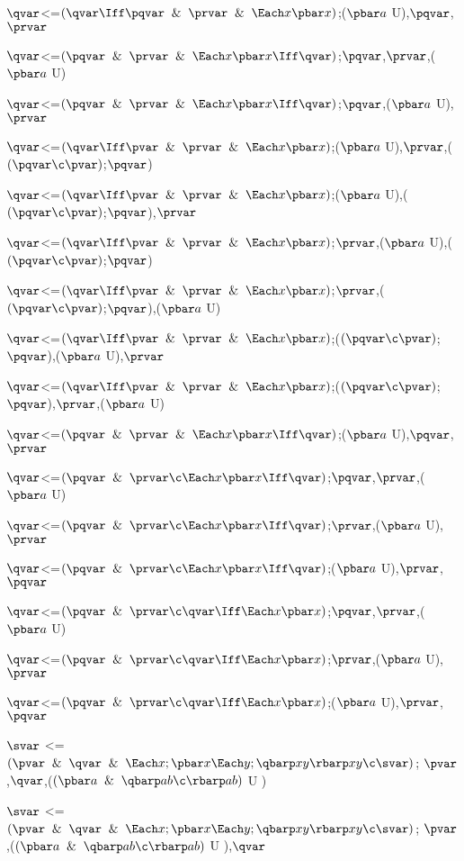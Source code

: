$\qvar$<=$(\qvar \Iff\pqvar \And \prvar\And \Each x\pbar x)$;($\pbar a$ U),$\pqvar$,$\prvar$

$\qvar$<=$(\pqvar \And \prvar \And \Each x\pbar x\Iff\qvar)$;$\pqvar$,$\prvar$,($\pbar a$ U)

$\qvar$<=$(\pqvar \And \prvar \And \Each x\pbar x\Iff\qvar)$;$\pqvar$,($\pbar a$ U),$\prvar$

$\qvar$<=$(\qvar \Iff\pvar \And \prvar\And \Each x\pbar x)$;($\pbar a$ U),$\prvar$,($(\pqvar \c \pvar)$;$\pqvar$)

$\qvar$<=$(\qvar \Iff\pvar \And \prvar\And \Each x\pbar x)$;($\pbar a$ U),($(\pqvar \c \pvar)$;$\pqvar$),$\prvar$

$\qvar$<=$(\qvar \Iff\pvar \And \prvar\And \Each x\pbar x)$;$\prvar$,($\pbar a$ U),($(\pqvar \c \pvar)$;$\pqvar$)

$\qvar$<=$(\qvar \Iff\pvar \And \prvar\And \Each x\pbar x)$;$\prvar$,($(\pqvar \c \pvar)$;$\pqvar$),($\pbar a$ U)

$\qvar$<=$(\qvar \Iff\pvar \And \prvar\And \Each x\pbar x)$;($(\pqvar \c \pvar)$;$\pqvar$),($\pbar a$ U),$\prvar$

$\qvar$<=$(\qvar \Iff\pvar \And \prvar\And \Each x\pbar x)$;($(\pqvar \c \pvar)$;$\pqvar$),$\prvar$,($\pbar a$ U)

$\qvar$<=$(\pqvar \And \prvar \And \Each x\pbar x\Iff\qvar)$;($\pbar a$ U),$\pqvar$,$\prvar$

$\qvar$<=$(\pqvar \And \prvar \c \Each x \pbar x\Iff \qvar)$;$\pqvar$,$\prvar$,($\pbar a$ U)

$\qvar$<=$(\pqvar \And \prvar \c \Each x \pbar x\Iff \qvar)$;$\prvar$,($\pbar a$ U),$\prvar$

$\qvar$<=$(\pqvar \And \prvar \c \Each x \pbar x\Iff \qvar)$;($\pbar a$ U),$\prvar$,$\pqvar$

$\qvar$<=$(\pqvar \And \prvar \c \qvar \Iff\Each x \pbar x)$;$\pqvar$,$\prvar$,($\pbar a$ U)

$\qvar$<=$(\pqvar \And \prvar \c \qvar \Iff\Each x \pbar x)$;$\prvar$,($\pbar a$ U),$\prvar$

$\qvar$<=$(\pqvar \And \prvar \c \qvar \Iff\Each x \pbar x)$;($\pbar a$ U),$\prvar$,$\pqvar$

$\svar$ <=  $(\pvar \And \qvar\And \Each x;\pbar x \Each y;\qbarp xy \rbarp xy \c \svar)$; $\pvar$,$\qvar$,($(\pbar a \And \qbarp ab \c \rbarp ab)$ U )

$\svar$ <=  $(\pvar \And \qvar\And \Each x;\pbar x \Each y;\qbarp xy \rbarp xy \c \svar)$; $\pvar$,($(\pbar a \And \qbarp ab \c \rbarp ab)$ U ),$\qvar$

